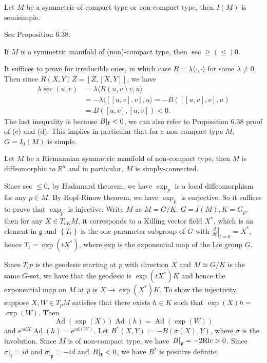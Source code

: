 \begin{proposition}
	Let $M$ be a symmetric of compact type or non-compact type,
	then $I(M)$ is semisimple.
\end{proposition}
\bproof
See \cite{Ziller} Proposition 6.38.
\eproof
\begin{proposition}
	If $M$ is a symmetric manifold of (non)-compact type, then
	$\sec \geq(\leq) 0$.
\end{proposition}
\bproof
It suffices to prove for irreducible ones, in which case
$B=\lambda\langle\cdot,\cdot\rangle$ for some
$\lambda \neq 0$. Then since $R(X, Y) Z=[Z,[X, Y]]$, we have
\[
\begin{aligned}
	\lambda \sec (u, v) & = \lambda\langle R(u, v) v, u\rangle
	\\
	&=-\lambda\langle[[u, v], v], u\rangle=-B([[u, v], v], u) \\
	&=B([u, v],[u, v]) < 0.
\end{aligned}
\]
The last inequality is because $B|_{{\mathfrak k}}<0$, we can also refer
to \cite{Ziller} Proposition 6.38 proof of (c) and (d).
\eproof
This implies in particular that for a non-compact type $M$, $G =
I_0(M)$ is simple.  
\begin{theorem}
	Let $M$ be a Riemannian symmetric manifold of non-compact
	type, then $M$
	is diffeomorphic to $\mathbb{R}^{n}$ and in particular, $M$
	is simply-connected.
\end{theorem}
\bproof
Since sec $\leq 0$, by Hadamard theorem, we have $\exp _{p}$ is
a local diffeomorphism for any $p \in M$. By Hopf-Rinow theorem,
we have $\exp _{p}$ is surjective. So it suffices to prove that
$\exp _{p}$ is injective. Write $M$ as $M = G / K$, $G = I(M),
K=G_{p}$, then for any $X \in T_{e K} M$, it corresponds to a
Killing vector field $X^{*}$, which is an element in
$\mathfrak{g}$ and $\left\{T_{t}\right\}$ is the one-parameter
subgroup of $G$ with $\left.\frac{d}{d t}\right|_{t=0} = X^{*}$,
hence $T_{t} = \exp \left(t X^{*}\right)$, where exp is the
exponential map of the Lie group $G$.

Since $T_{t} p$ is the geodesic starting at $p$ with direction
$X$ and $M \simeq G / K$ is the same $G$-set, we have that the
geodesic is $\exp \left(t X^{*}\right) K$ and hence the
exponential map on $M$ at $p$ is $X \rightarrow \exp
\left(X^{*}\right) K$. To show the injectivity, suppose $X, W
\in T_{p} M$ satisfies that there exists $h \in K$ such that
$\exp (X) h = $ $\exp \left(W\right)$. Then
\[
\operatorname{Ad}(\exp (X)) \operatorname{Ad}(h) =
\operatorname{Ad}\left(\exp \left(W\right)\right)
\]
and $e^{\mathrm{ad} X} \operatorname{Ad}(h) =
e^{\mathrm{ad}\left(W\right)}$. Let $B^{*}(X, Y):=-B(\sigma(X),
Y)$, where $\sigma$ is the
involution. Since $M$ is of non-compact type, we have
$\left.B\right|_{{\mathfrak p}} = -2 \mathrm{Ric}>0$. Since
$\left.\sigma\right|_{\mathfrak{k}} = i d$ and
$\left.\sigma\right|_{\mathfrak{p}} =-i d$ and
$\left.B\right|_{{\mathfrak k}}<0$, we have $B^{*}$ is positive definite.


